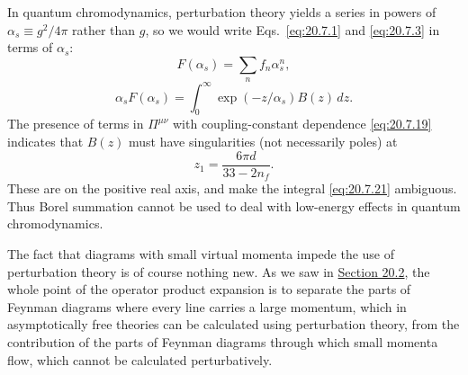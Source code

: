 In quantum chromodynamics, perturbation theory yields a series in powers of $\alpha_s\equiv g^2/4\pi$ rather than $g$, so we would write Eqs.~\eqref{eq:20.7.1} and \eqref{eq:20.7.3} in terms of $\alpha_s$:
\begin{equation}
F(\alpha_s)=\sum_n f_n\alpha_s^n,
\tag{20.7.20}\label{eq:20.7.20}
\end{equation}
\begin{equation}
\alpha_sF(\alpha_s)
=\int_0^\infty\exp(-z/\alpha_s)B(z)\,dz.
\tag{20.7.21}\label{eq:20.7.21}
\end{equation}
The presence of terms in $\Pi^{\mu\nu}$ with coupling-constant dependence \eqref{eq:20.7.19} indicates that $B(z)$ must have singularities (not necessarily poles) at
\begin{equation}
z_1=\frac{6\pi d}{33-2n_f}.
\tag{20.7.22}\label{eq:20.7.22}
\end{equation}
These are on the positive real axis, and make the integral \eqref{eq:20.7.21} ambiguous. Thus Borel summation cannot be used to deal with low-energy effects in quantum chromodynamics.

The fact that diagrams with small virtual momenta impede the use of perturbation theory is of course nothing new. As we saw in \hyperref[sec:20.2]{Section 20.2}, the whole point of the operator product expansion is to separate the parts of Feynman diagrams where every line carries a large momentum, which in asymptotically free theories can be calculated using perturbation theory, from the contribution of the parts of Feynman diagrams through which small momenta flow, which cannot be calculated perturbatively.
